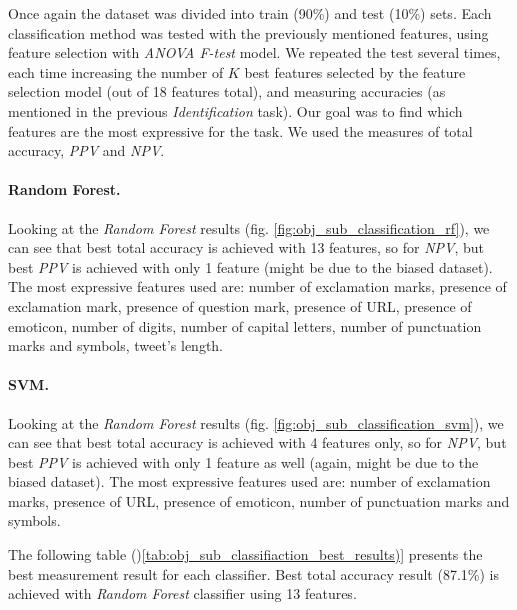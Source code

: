\documentclass[letterpaper,twocolumn,10pt]{article}
\begin{document}
Once again the dataset was divided into train (90\%) and test (10\%) sets. Each classification method was tested with the previously mentioned features, using feature selection with \textit{ANOVA F-test} model. We repeated the test several times, each time increasing the number of $K$ best features selected by the feature selection model (out of 18 features total), and measuring accuracies (as mentioned in the previous \textit{Identification} task). Our goal was to find which features are the most expressive for the task. We used the measures of total accuracy, \textit{PPV} and \textit{NPV}.

\paragraph{Random Forest.} Looking at the \textit{Random Forest} results (fig.  \ref{fig:obj_sub_classification_rf}), we can see that best total accuracy is achieved with 13 features, so for \textit{NPV}, but best \textit{PPV} is achieved with only 1 feature (might be due to the biased dataset). The most expressive features used are:
number of exclamation marks, presence of exclamation mark, presence of question mark, presence of URL, presence of emoticon, number of digits, number of capital letters, number of punctuation marks and symbols, tweet's length.

\paragraph{SVM.} Looking at the \textit{Random Forest} results (fig.  \ref{fig:obj_sub_classification_svm}), we can see that best total accuracy is achieved with 4 features only, so for \textit{NPV}, but best \textit{PPV} is achieved with only 1 feature as well (again, might be due to the biased dataset). The most expressive features used are:
number of exclamation marks, presence of URL, presence of emoticon, number of punctuation marks and symbols.

The following table  ()\ref{tab:obj_sub_classifiaction_best_results)} presents the best measurement result for each classifier. Best total accuracy result (87.1\%) is achieved with \textit{Random Forest} classifier using 13 features. \\

\begin{table}[H]

	\begin{center}
	\end{center}
	\caption{Objective/Subjective Classification Best Results (in parentheses - number of features used)}
\label{tab:obj_sub_classifiaction_best_results}
\end{table}
\end{document}
